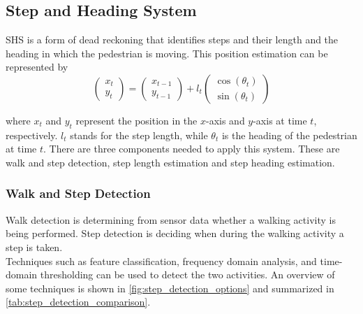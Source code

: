 \subsection{Step and Heading System}
\label{sec:rw-SHS}
\ac{SHS} is a form of dead reckoning that identifies steps and their length and the heading in which the pedestrian is moving. This position estimation can be represented by \cite{MunozDiaz2019}
\begin{equation}
	\label{eq:SHS_dynamic_model}
	\left(\begin{array}{l}
		x_t \\
		y_t
	\end{array}\right) 
	=
	\left(\begin{array}{l}
		x_{t-1} \\
		y_{t-1}
	\end{array}\right) 
	+l_{t} \left(\begin{array}{l}
		\cos \left(\theta_{t}\right) \\
		\sin \left(\theta_{t}\right)
	\end{array}\right)
\end{equation}

where $x_{t}$  and  $y_{t}$ represent the position in the $x$-axis and $y$-axis at time  $t$, respectively. $l_{t}$ stands for the step length, while $\theta_{t}$ is the heading of the pedestrian at time $t$.
There are three components needed to apply this system. These are walk and step detection, step length estimation and step heading estimation.


\subsubsection{Walk and Step Detection}
\label{sec:rw - step detection}
Walk detection is determining from sensor data whether a walking activity is being performed. Step detection is deciding when during the walking activity a step is taken. \\
Techniques such as feature classification, frequency domain analysis, and time-domain thresholding can be used to detect the two activities. An overview of some techniques  is  shown in \cref{fig:step_detection_options} and summarized in \cref{tab:step_detection_comparison}. %

